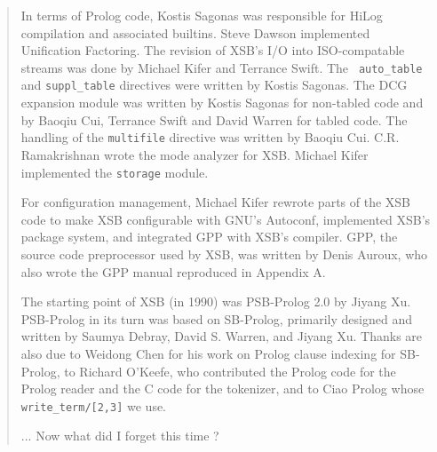 \begin{quote}
In terms of Prolog code, Kostis Sagonas was responsible for HiLog
compilation and associated builtins.  Steve Dawson implemented
Unification Factoring.  The revision of XSB's I/O into ISO-compatable
streams was done by Michael Kifer and Terrance Swift.  The {\tt
  auto\_table} and {\tt suppl\_table} directives were written by
Kostis Sagonas.  The DCG expansion module was written by Kostis
Sagonas for non-tabled code and by Baoqiu Cui, Terrance Swift and
David Warren for tabled code.  The handling of the {\tt multifile}
directive was written by Baoqiu Cui. C.R. Ramakrishnan wrote the mode
analyzer for XSB.  Michael Kifer implemented the {\tt storage} module.

For configuration management, Michael Kifer rewrote parts of the XSB
code to make XSB configurable with GNU's Autoconf, implemented XSB's
package system, and integrated GPP with XSB's compiler.  GPP, the
source code preprocessor used by XSB, was written by Denis Auroux, who
also wrote the GPP manual reproduced in Appendix A.

The starting point of XSB (in 1990) was PSB-Prolog 2.0 by Jiyang Xu.
PSB-Prolog in its turn was based on SB-Prolog, primarily designed and
written by Saumya Debray, David S. Warren, and Jiyang Xu.  Thanks are
also due to Weidong Chen for his work on Prolog clause indexing for
SB-Prolog, to Richard O'Keefe, who contributed the Prolog code for the
Prolog reader and the C code for the tokenizer, and to Ciao Prolog
whose {\tt write\_term/[2,3]} we use.

... Now what did I forget this time ?

\end{quote}

